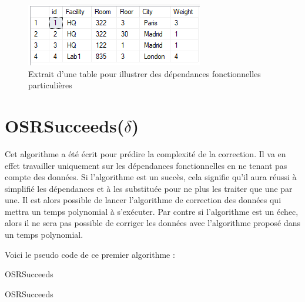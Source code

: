 \documentclass[12pt, a4paper, oneside, titlepage]{book}%
\makeatletter
\def\BState{\State\hskip-\ALG@thistlm}
\makeatother
\begin{document}
\begin{figure}[ht]
	\center
	\includegraphics{DFnok.png}
	\caption{\label{picDFnok} Extrait d'une table pour illustrer des dépendances fonctionnelles particulières}
\end{figure}


\section{OSRSucceeds($\delta$)}

Cet algorithme a été écrit pour prédire la complexité de la correction. Il va en effet travailler uniquement sur les dépendances fonctionnelles en ne tenant pas compte des données. Si l'algorithme est un succès, cela signifie qu'il aura réussi à simplifié les dépendances et à les substituée pour ne plus les traiter que une par une. Il est alors possible de lancer l'algorithme de correction des données qui mettra un temps polynomial à s'exécuter. Par contre si l'algorithme est un échec, alors il ne sera pas possible de corriger les données avec l'algorithme proposé dans un temps polynomial.

Voici le pseudo code de ce premier algorithme : 
\begin{algorithm}
\caption{OSRSucceeds}\label{euclid}
\end{algorithm}

\begin{algorithm}
\caption{OSRSucceeds}\label{euclid}
\end{algorithm}
\end{document}
